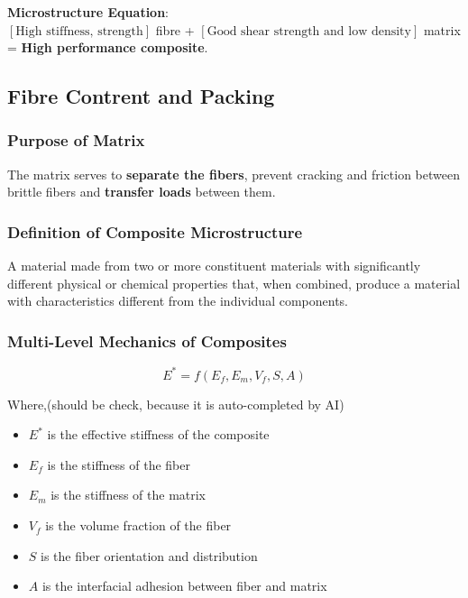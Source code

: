 \documentclass{NoteThesis/note-thesis}
\begin{document}
\textbf{Microstructure Equation}: \\ \quad $\left[ \text{High stiffness, strength} \right]$ fibre + $\left[ \text{Good shear strength and low density} \right]$ matrix \\ \qquad = \textbf{High performance composite}.

\subsection{Fibre Contrent and Packing}

\subsubsection*{Purpose of Matrix}

The matrix serves to \textbf{separate the fibers}, prevent cracking and friction between brittle fibers and \textbf{transfer loads} between them.

\subsubsection*{Definition of Composite Microstructure}

A material made from two or more constituent materials with significantly different physical or chemical properties that, when combined, produce a material with characteristics different from the individual components.

\subsubsection*{Multi-Level Mechanics of Composites}

\begin{equation*}
    E^* = f(E_f,E_m,V_f,S,A)
\end{equation*}

Where,(should be check, because it is auto-completed by AI)
\begin{itemize}
    \item $E^*$ is the effective stiffness of the composite
    \item $E_f$ is the stiffness of the fiber
    \item $E_m$ is the stiffness of the matrix
    \item $V_f$ is the volume fraction of the fiber
    \item $S$ is the fiber orientation and distribution
    \item $A$ is the interfacial adhesion between fiber and matrix
\end{itemize}
\end{document}
